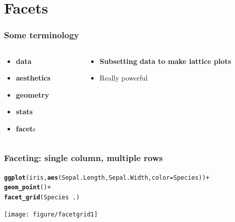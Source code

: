 \documentclass{beamer}\usepackage[]{graphicx}\usepackage[]{color}
\makeatletter
\newcommand{\hlkwd}[1]{\textcolor[rgb]{0.737,0.353,0.396}{\textbf{#1}}}%
\newenvironment{kframe}{%
 \def\at@end@of@kframe{}%
 \ifinner\ifhmode%
  \def\at@end@of@kframe{\end{minipage}}%
  \begin{minipage}{\columnwidth}%
 \fi\fi%
 \def\FrameCommand##1{\hskip\@totalleftmargin \hskip-\fboxsep
 \colorbox{shadecolor}{##1}\hskip-\fboxsep
     \hskip-\linewidth \hskip-\@totalleftmargin \hskip\columnwidth}%
 \MakeFramed {\advance\hsize-\width
   \@totalleftmargin\z@ \linewidth\hsize
   \@setminipage}}%
 {\par\unskip\endMakeFramed%
 \at@end@of@kframe}
\newenvironment{knitrout}{}{} %
\makeatother
\begin{document}
\section*{Facets}
\frame{\sectionpage}



\begin{frame}[fragile]
\frametitle{Some terminology}
\begin{columns}[t]

\begin{column}[T]{3cm}
\begin{itemize}
    \item \textbf{\color{gray}data}
    \item \textbf{\color{gray}aesthetics}
    \item \textbf{\color{gray}geometry}
    \item \textbf{\color{gray}stats}
    \item \textbf{facet}s
\end{itemize}
\end{column}

\begin{column}[T]{8cm}
\begin{itemize}
    \item \textbf{Subsetting data to make lattice plots}
    \item Really powerful
\end{itemize}
\end{column}

\end{columns}
\end{frame}


\begin{frame}[fragile]
\frametitle{Faceting: single column, multiple rows}
\begin{knitrout}\footnotesize
{}\color{fgcolor}\begin{kframe}
\begin{alltt}
\hlkwd{ggplot}(iris, \hlkwd{aes}(Sepal.Length, Sepal.Width, color = Species)) +
\hlkwd{geom_point}() +
\hlkwd{facet_grid}(Species ~ .)
\end{alltt}
\end{kframe}

{\centering \texttt{[image: figure/facetgrid1]} 

}



\end{knitrout}

\end{frame}
\end{document}

